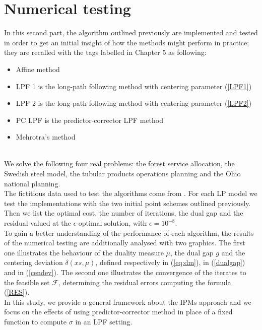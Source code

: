 \documentclass[a4paper,10 pt,titlepage,twoside]{book}
\theoremstyle{plain}
\theoremstyle{definition}
\theoremstyle{remark}
\begin{document}
{{\chapter{Numerical testing}
In this second part, the algorithm outlined previously are implemented and tested in order to get an initial insight of how the methods might
perform in practice; they are recalled with the tags labelled in Chapter 5 as following:
\begin{itemize}
	\item Affine method
	\item LPF 1 is the long-path following method with centering parameter (\ref{LPF1})
	\item LPF 2 is the long-path following method with centering parameter (\ref{LPF2})
	\item PC LPF is the predictor-corrector LPF method 
	\item Mehrotra's method
\end{itemize}\\ We solve the following four real problems: the forest service allocation, the Swedish steel model, the tubular products operations planning and the Ohio national planning.\\
The fictitious data used to test the algorithms come from \cite{RR}.
For each LP model we test the implementations with the two initial point schemes outlined previously. Then we list the optimal cost, the number of iterations, the dual gap and the residual valued at the $\epsilon$-optimal solution, with $\epsilon= 10^{-8}$.\\ To gain a better understanding of the performance of each algorithm, the results of the numerical testing are additionally analysed with two graphics. The first one illustrates the behaviour of the duality measure $\mu$, the dual gap $g$ and the centering deviation $\delta(xs, \mu)$, defined respectively in (\ref{eq:dm}), in (\ref{dualgap}) and in (\ref{cendev}). The second one illustrates the convergence of the iterates to the feasible set $\mathcal{F}$, determining the residual errors computing the formula (\ref{RES}).\\
In this study, we provide a general framework about the IPMs approach and we focus on the effects of using predictor-corrector method in place of a fixed function to compute $\sigma$ in an LPF setting. 
}}
\end{document}
